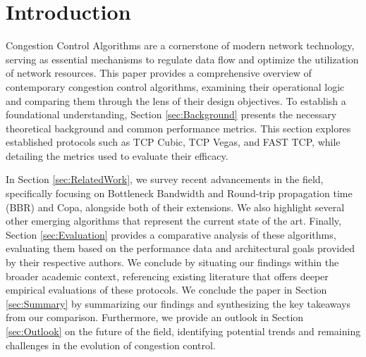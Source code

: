 \section{Introduction}

Congestion Control Algorithms are a cornerstone of modern network technology, serving as essential mechanisms to regulate data flow and optimize the utilization of network resources. 
This paper provides a comprehensive overview of contemporary congestion control algorithms, examining their operational logic and comparing them through the lens of their design objectives.
To establish a foundational understanding, Section \ref{sec:Background} presents the necessary theoretical background and common performance metrics. 
This section explores established protocols such as TCP Cubic, TCP Vegas, and FAST TCP, while detailing the metrics used to evaluate their efficacy.

In Section \ref{sec:RelatedWork}, we survey recent advancements in the field, specifically focusing on Bottleneck Bandwidth and Round-trip propagation time (BBR) and Copa, alongside both of their extensions. 
We also highlight several other emerging algorithms that represent the current state of the art.
Finally, Section \ref{sec:Evaluation} provides a comparative analysis of these algorithms, evaluating them based on the performance data and architectural goals provided by their respective authors. 
We conclude by situating our findings within the broader academic context, referencing existing literature that offers deeper empirical evaluations of these protocols.
We conclude the paper in Section \ref{sec:Summary} by summarizing our findings and synthesizing the key takeaways from our comparison. 
Furthermore, we provide an outlook in Section \ref{sec:Outlook} on the future of the field, identifying potential trends and remaining challenges in the evolution of congestion control.
